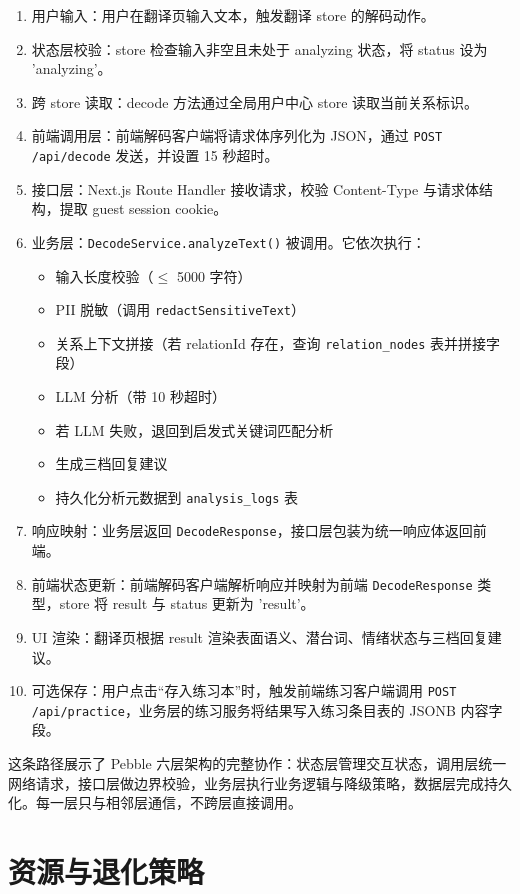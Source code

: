 \begin{enumerate}
  \item 用户输入：用户在翻译页输入文本，触发翻译 store 的解码动作。
  \item 状态层校验：store 检查输入非空且未处于 analyzing 状态，将 status 设为 'analyzing'。
  \item 跨 store 读取：decode 方法通过全局用户中心 store 读取当前关系标识。
  \item 前端调用层：前端解码客户端将请求体序列化为 JSON，通过 \texttt{POST /api/decode} 发送，并设置 15 秒超时。
  \item 接口层：Next.js Route Handler 接收请求，校验 Content-Type 与请求体结构，提取 guest session cookie。
  \item 业务层：\texttt{DecodeService.analyzeText()} 被调用。它依次执行：
    \begin{itemize}
      \item 输入长度校验（$\le$ 5000 字符）
      \item PII 脱敏（调用 \texttt{redactSensitiveText}）
      \item 关系上下文拼接（若 relationId 存在，查询 \texttt{relation\_nodes} 表并拼接字段）
      \item LLM 分析（带 10 秒超时）
      \item 若 LLM 失败，退回到启发式关键词匹配分析
      \item 生成三档回复建议
      \item 持久化分析元数据到 \texttt{analysis\_logs} 表
    \end{itemize}
  \item 响应映射：业务层返回 \texttt{DecodeResponse}，接口层包装为统一响应体返回前端。
  \item 前端状态更新：前端解码客户端解析响应并映射为前端 \texttt{DecodeResponse} 类型，store 将 result 与 status 更新为 'result'。
  \item UI 渲染：翻译页根据 result 渲染表面语义、潜台词、情绪状态与三档回复建议。
  \item 可选保存：用户点击“存入练习本”时，触发前端练习客户端调用 \texttt{POST /api/practice}，业务层的练习服务将结果写入练习条目表的 JSONB 内容字段。
\end{enumerate}

这条路径展示了 Pebble 六层架构的完整协作：状态层管理交互状态，调用层统一网络请求，接口层做边界校验，业务层执行业务逻辑与降级策略，数据层完成持久化。每一层只与相邻层通信，不跨层直接调用。


\section{资源与退化策略}

